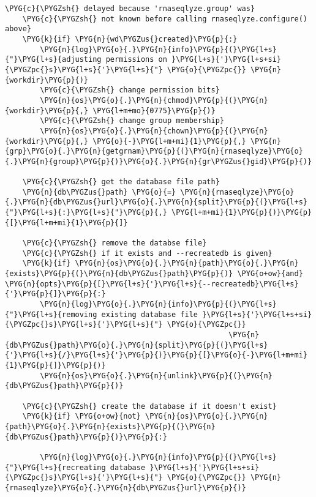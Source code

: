 \begin{Verbatim}[commandchars=\\\{\}]
    \PYG{c}{\PYGZsh{} delayed because 'rnaseqlyze.group' was}
    \PYG{c}{\PYGZsh{} not known before calling rnaseqlyze.configure() above}
    \PYG{k}{if} \PYG{n}{wd\PYGZus{}created}\PYG{p}{:}
        \PYG{n}{log}\PYG{o}{.}\PYG{n}{info}\PYG{p}{(}\PYG{l+s}{"}\PYG{l+s}{adjusting permissions on }\PYG{l+s}{'}\PYG{l+s+si}{\PYGZpc{}s}\PYG{l+s}{'}\PYG{l+s}{"} \PYG{o}{\PYGZpc{}} \PYG{n}{workdir}\PYG{p}{)}
        \PYG{c}{\PYGZsh{} change permission bits}
        \PYG{n}{os}\PYG{o}{.}\PYG{n}{chmod}\PYG{p}{(}\PYG{n}{workdir}\PYG{p}{,} \PYG{l+m+mo}{0775}\PYG{p}{)}
        \PYG{c}{\PYGZsh{} change group membership}
        \PYG{n}{os}\PYG{o}{.}\PYG{n}{chown}\PYG{p}{(}\PYG{n}{workdir}\PYG{p}{,} \PYG{o}{-}\PYG{l+m+mi}{1}\PYG{p}{,} \PYG{n}{grp}\PYG{o}{.}\PYG{n}{getgrnam}\PYG{p}{(}\PYG{n}{rnaseqlyze}\PYG{o}{.}\PYG{n}{group}\PYG{p}{)}\PYG{o}{.}\PYG{n}{gr\PYGZus{}gid}\PYG{p}{)}

    \PYG{c}{\PYGZsh{} get the database file path}
    \PYG{n}{db\PYGZus{}path} \PYG{o}{=} \PYG{n}{rnaseqlyze}\PYG{o}{.}\PYG{n}{db\PYGZus{}url}\PYG{o}{.}\PYG{n}{split}\PYG{p}{(}\PYG{l+s}{"}\PYG{l+s}{:}\PYG{l+s}{"}\PYG{p}{,} \PYG{l+m+mi}{1}\PYG{p}{)}\PYG{p}{[}\PYG{l+m+mi}{1}\PYG{p}{]}

    \PYG{c}{\PYGZsh{} remove the databse file}
    \PYG{c}{\PYGZsh{} if it exists and --recreatedb is given}
    \PYG{k}{if} \PYG{n}{os}\PYG{o}{.}\PYG{n}{path}\PYG{o}{.}\PYG{n}{exists}\PYG{p}{(}\PYG{n}{db\PYGZus{}path}\PYG{p}{)} \PYG{o+ow}{and} \PYG{n}{opts}\PYG{p}{[}\PYG{l+s}{'}\PYG{l+s}{--recreatedb}\PYG{l+s}{'}\PYG{p}{]}\PYG{p}{:}
        \PYG{n}{log}\PYG{o}{.}\PYG{n}{info}\PYG{p}{(}\PYG{l+s}{"}\PYG{l+s}{removing existing database file }\PYG{l+s}{'}\PYG{l+s+si}{\PYGZpc{}s}\PYG{l+s}{'}\PYG{l+s}{"} \PYG{o}{\PYGZpc{}}
                                                   \PYG{n}{db\PYGZus{}path}\PYG{o}{.}\PYG{n}{split}\PYG{p}{(}\PYG{l+s}{'}\PYG{l+s}{/}\PYG{l+s}{'}\PYG{p}{)}\PYG{p}{[}\PYG{o}{-}\PYG{l+m+mi}{1}\PYG{p}{]}\PYG{p}{)}
        \PYG{n}{os}\PYG{o}{.}\PYG{n}{unlink}\PYG{p}{(}\PYG{n}{db\PYGZus{}path}\PYG{p}{)}

    \PYG{c}{\PYGZsh{} create the database if it doesn't exist}
    \PYG{k}{if} \PYG{o+ow}{not} \PYG{n}{os}\PYG{o}{.}\PYG{n}{path}\PYG{o}{.}\PYG{n}{exists}\PYG{p}{(}\PYG{n}{db\PYGZus{}path}\PYG{p}{)}\PYG{p}{:}

        \PYG{n}{log}\PYG{o}{.}\PYG{n}{info}\PYG{p}{(}\PYG{l+s}{"}\PYG{l+s}{recreating database }\PYG{l+s}{'}\PYG{l+s+si}{\PYGZpc{}s}\PYG{l+s}{'}\PYG{l+s}{"} \PYG{o}{\PYGZpc{}} \PYG{n}{rnaseqlyze}\PYG{o}{.}\PYG{n}{db\PYGZus{}url}\PYG{p}{)}


\end{Verbatim}
